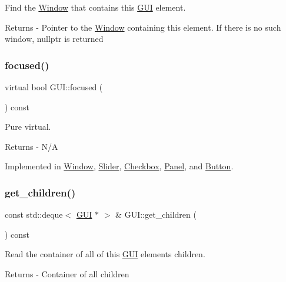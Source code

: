 Find the \mbox{\hyperlink{class_window}{Window}} that contains this \mbox{\hyperlink{class_g_u_i}{G\+UI}} element. \begin{DoxyReturn}{Returns}
-\/ Pointer to the \mbox{\hyperlink{class_window}{Window}} containing this element. If there is no such window, nullptr is returned 
\end{DoxyReturn}
\mbox{\label{class_g_u_i_ad2a7c1ae3938ba1d6dea0142f16d6c2b}} 
\subsubsection{\texorpdfstring{focused()}{focused()}}
{\footnotesize\ttfamily virtual bool G\+U\+I\+::focused (\begin{DoxyParamCaption}{ }\end{DoxyParamCaption}) const\hspace{0.3cm}{\ttfamily [pure virtual]}}

Pure virtual. \begin{DoxyReturn}{Returns}
-\/ N/A 
\end{DoxyReturn}


Implemented in \mbox{\hyperlink{class_window_af79c5fde03ed3825e0459a267ea01dee}{Window}}, \mbox{\hyperlink{class_slider_a30b01348a5d214f3078e22516c60a763}{Slider}}, \mbox{\hyperlink{class_checkbox_a2a2c82a9e8c95ad868ce85a60ba07292}{Checkbox}}, \mbox{\hyperlink{class_panel_ace2217419ea5c2e98a38678c6e2012e1}{Panel}}, and \mbox{\hyperlink{class_button_a2c1b0adeb2920b394fe4f38354ae6604}{Button}}.

\mbox{\label{class_g_u_i_a680f20f016eadb403939f14dd5a820dc}} 
\subsubsection{\texorpdfstring{get\+\_\+children()}{get\_children()}}
{\footnotesize\ttfamily const std\+::deque$<$ \mbox{\hyperlink{class_g_u_i}{G\+UI}} $\ast$ $>$ \& G\+U\+I\+::get\+\_\+children (\begin{DoxyParamCaption}{ }\end{DoxyParamCaption}) const}

Read the container of all of this \mbox{\hyperlink{class_g_u_i}{G\+UI}} element\textquotesingle{}s children. \begin{DoxyReturn}{Returns}
-\/ Container of all children 
\end{DoxyReturn}
\mbox{\label{class_g_u_i_a4e427bc7271c6478d98f2215349dce07}} 

